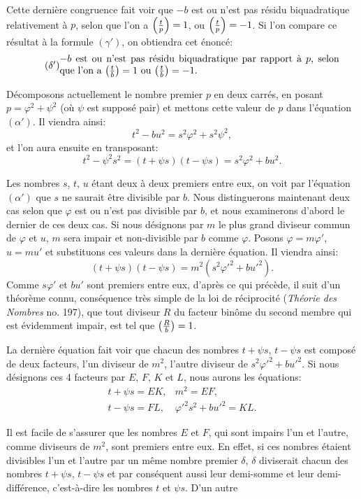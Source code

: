 \noindent
Cette dernière congruence fait voir que $-b$ est ou n'est pas résidu biquadratique
relativement à $p$, selon que l'on a $\left(\frac{t}{p}\right)=1$, ou $\left(\frac{t}{p}\right)=-1$. Si l'on compare
ce résultat à la formule $(\gamma')$, on obtiendra cet énoncé:
\begin{equation*}\tag{$\delta'$}
\begin{minipage}{0.83\textwidth}
$-b$ est ou n'est pas résidu biquadratique par rapport à $p$, selon
que l'on a $\leg{t}{b}=1$ ou $\leg{t}{b}=-1$.
\end{minipage}
\end{equation*}
\par\indent
Décomposons actuellement le nombre premier $p$ en deux carrés, en posant
$p=\varphi^2+\psi^2$ (où $\psi$ est supposé pair) et mettons cette valeur de $p$ dans
l'équation $(\alpha')$. Il viendra ainsi:
\[
t^2-bu^2=s^2\varphi^2+s^2\psi^2,
\]
et l'on aura ensuite en transposant:
\[
t^2-\psi^2s^2=(t+\psi s)(t-\psi s)=s^2\varphi^2+bu^2.
\]
\par\indent
Les nombres $s$, $t$, $u$ étant deux à deux premiers entre eux, on voit
par l'équation $(\alpha')$ que $s$ ne saurait être divisible par $b$. Nous distinguerons
maintenant deux cas selon que $\varphi$ est ou n'est pas divisible par $b$, et nous
examinerons d'abord le dernier de ces deux cas. Si nous désignons par
$m$ le plus grand diviseur commun de $\varphi$ et $u$, $m$ sera impair et non-divisible
par $b$ comme $\varphi$. Posons $\varphi=m\varphi'$, $u=mu'$ et substituons ces valeurs dans
la dernière équation. Il viendra ainsi:
\[
(t+\psi s)(t-\psi s)=m^2(s^2\varphi'^2+bu'^2).
\]
Comme $s\varphi'$ et $bu'$ sont premiers entre eux, d'après ce qui précède, il suit
d'un théorème connu, conséquence très simple de la loi de réciprocité (\emph{Théorie
des Nombres} no. 197), que tout diviseur $R$ du facteur binôme du second membre
qui est évidemment impair, est tel que $\left(\frac{R}{b}\right)=1$.
\par\indent
La dernière équation fait voir que chacun des nombres $t+\psi s$, $t-\psi s$
est composé de deux facteurs, l'un diviseur de $m^2$, l'autre diviseur de $s^2\varphi'^2+bu'^2$.
Si nous désignons ces 4 facteurs par $E$, $F$, $K$ et $L$, nous aurons les équations:
\[
\begin{array}{ll}
t+\psi s=EK,&m^2=EF,\\
t-\psi s=FL,&\varphi'^2s^2+bu'^2=KL.
\end{array}
\]
\par\indent
Il est facile de s'assurer que les nombres $E$ et $F$, qui sont impairs l'un
et l'autre, comme diviseurs de $m^2$, sont premiers entre eux. En effet, si ces
nombres étaient divisibles l'un et l'autre par un même nombre premier $\delta$, $\delta$
diviserait chacun des nombres $t+\psi s$, $t-\psi s$ et par conséquent aussi leur demi-somme
et leur demi-différence, c'est-à-dire les nombres $t$ et $\psi s$. D'un autre
